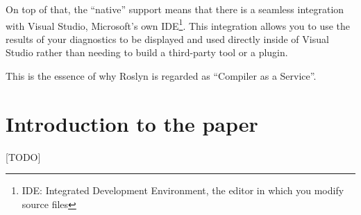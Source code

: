 On top of that, the “native” support means that there is a seamless integration with Visual Studio, Microsoft’s own IDE\footnote{IDE: Integrated Development Environment, the editor in which you modify source files}. This integration allows you to use the results of your diagnostics to be displayed and used directly inside of Visual Studio rather than needing to build a third-party tool or a plugin.

\noindent This is the essence of why Roslyn is regarded as “Compiler as a Service”.



\section{Introduction to the paper}
\label{sec-intro-paper}

[TODO]